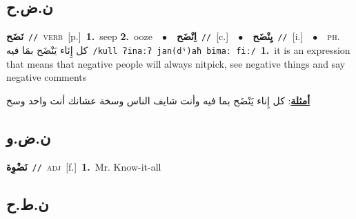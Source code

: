 \documentclass[10pt,a4paper,twoside]{article} %
\begin{document}
\begin{multicols}{2}
\vspace{-3mm}
\subsection*{\color{blue}\foreignlanguage{arabic}{ن.ض.ح}\color{blue}{}} 

{\setlength\topsep{0pt}\textbf{\foreignlanguage{arabic}{نَضَح}}\ {\color{gray}\texttt{//}\color{black}}\ \textsc{verb}\ [p.]\ \textbf{1.}~seep  \textbf{2.}~ooze\ \ $\bullet$\ \ \setlength\topsep{0pt}\textbf{\foreignlanguage{arabic}{اِنْضَح}}\ {\color{gray}\texttt{//}\color{black}}\ [c.]\ \ $\bullet$\ \ \setlength\topsep{0pt}\textbf{\foreignlanguage{arabic}{يِنْضَح}}\ {\color{gray}\texttt{//}\color{black}}\ [i.]\ \ $\bullet$\ \ \textsc{ph.} \color{gray} \foreignlanguage{arabic}{كل إِنَاء يَنْضَح بمَا فيه}\color{black}\ {\color{gray}\texttt{/{\sffamily kull ʔinaːʔ jan(dˤ)aħ bimaː fiː}/}\color{black}}\ \textbf{1.}~it is an expression that means that negative people will always nitpick, see negative things and say negative comments\  \begin{flushright}\color{gray}\foreignlanguage{arabic}{\textbf{\underline{\foreignlanguage{arabic}{أمثلة}}}: كل إِناء يَنْضَح بما فيه وأنت شايف الناس وسخة عشانك أنت واحد وسخ}\end{flushright}\color{black}} \vspace{2mm}

\vspace{-3mm}
\subsection*{\color{blue}\foreignlanguage{arabic}{ن.ض.و}\color{blue}{}} 

{\setlength\topsep{0pt}\textbf{\foreignlanguage{arabic}{نَضْوِة}}\ {\color{gray}\texttt{//}\color{black}}\ \textsc{adj}\ [f.]\ \textbf{1.}~Mr. Know-it-all\ } \vspace{2mm}

\vspace{-3mm}
\subsection*{\color{blue}\foreignlanguage{arabic}{ن.ط.ح}\color{blue}{}} 


\end{multicols}
\end{document}
